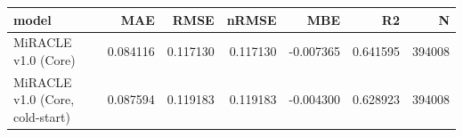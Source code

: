 \begin{tabular}{lrrrrrr}
\toprule
model & MAE & RMSE & nRMSE & MBE & R2 & N \\
\midrule
MiRACLE v1.0 (Core) & 0.084116 & 0.117130 & 0.117130 & -0.007365 & 0.641595 & 394008 \\
MiRACLE v1.0 (Core, cold-start) & 0.087594 & 0.119183 & 0.119183 & -0.004300 & 0.628923 & 394008 \\
\bottomrule
\end{tabular}
